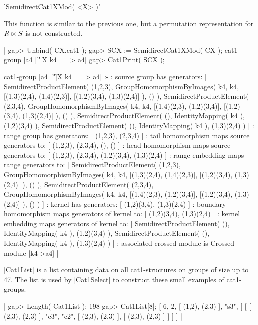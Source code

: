 %

'SemidirectCat1XMod( <X> )'

This  function is  similar to  the   previous one, but a   permutation
representation for $R \semidirect S$ is not constructed.

|    gap> Unbind( CX.cat1 );
    gap> SCX := SemidirectCat1XMod( CX );
    cat1-group [a4 |'\|'|X k4 ==> a4] 
    gap> Cat1Print( SCX );

    cat1-group [a4 |'\|'|X k4 ==> a4] :- 
    : source group has generators:
      [ SemidirectProductElement( (1,2,3), GroupHomomorphismByImages( k4,
         k4, [(1,3)(2,4), (1,4)(2,3)], [(1,2)(3,4), (1,3)(2,4)] ), () ), 
        SemidirectProductElement( (2,3,4), GroupHomomorphismByImages( k4, 
         k4, [(1,4)(2,3), (1,2)(3,4)], [(1,2)(3,4), (1,3)(2,4)] ), () ), 
        SemidirectProductElement( (), IdentityMapping( k4 ), (1,2)(3,4) ), 
        SemidirectProductElement( (), IdentityMapping( k4 ), (1,3)(2,4) ) ]
    :  range group has generators:
      [ (1,2,3), (2,3,4) ]
    : tail homomorphism maps source generators to:
      [ (1,2,3), (2,3,4), (), () ]
    : head homomorphism maps source generators to:
      [ (1,2,3), (2,3,4), (1,2)(3,4), (1,3)(2,4) ]
    : range embedding maps range generators to:
      [ SemidirectProductElement( (1,2,3), GroupHomomorphismByImages( k4,
         k4, [(1,3)(2,4), (1,4)(2,3)], [(1,2)(3,4), (1,3)(2,4)] ), () ), 
        SemidirectProductElement( (2,3,4), GroupHomomorphismByImages( k4,
         k4, [(1,4)(2,3), (1,2)(3,4)], [(1,2)(3,4), (1,3)(2,4)] ), () ) ]
    : kernel has generators:
      [ (1,2)(3,4), (1,3)(2,4) ]
    : boundary homomorphism maps generators of kernel to:
      [ (1,2)(3,4), (1,3)(2,4) ]
    : kernel embedding maps generators of kernel to:
      [ SemidirectProductElement( (), IdentityMapping( k4 ), (1,2)(3,4) ), 
        SemidirectProductElement( (), IdentityMapping( k4 ), (1,3)(2,4) ) ]
    : associated crossed module is Crossed module [k4->a4]   |

%

|Cat1List| is a list containing  data on all cat1-structures on groups
of size up to 47.  The list is used by |Cat1Select| to construct these
small examples of cat1-groups.

|    gap> Length( Cat1List );
    198
    gap> Cat1List[8];
    [ 6, 2, [ (1,2), (2,3) ], "s3", 
            [ [ [ (2,3), (2,3) ], "c3", "c2", [ (2,3), (2,3) ], 
            [ (2,3), (2,3) ] ] ] ]  |

